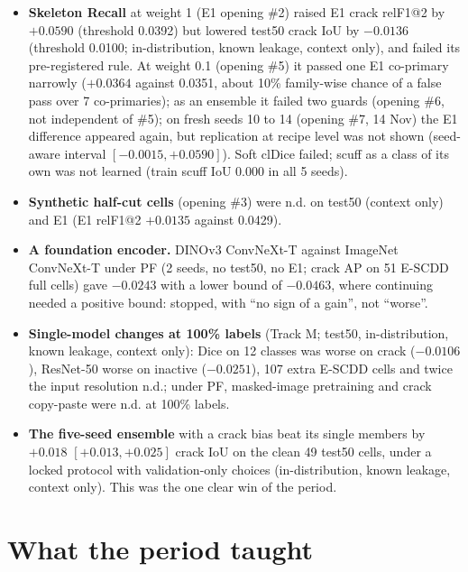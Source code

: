\begin{itemize}
  \item \textbf{Skeleton Recall} \citep{kirchhoff2024skeletonrecall} at weight 1 (E1 opening \#2) raised E1 crack relF1@2 by $+0.0590$
    (threshold 0.0392) but lowered test50 crack IoU by $-0.0136$ (threshold 0.0100; in-distribution, known leakage, context
    only), and failed its pre-registered rule. At weight
    0.1 (opening \#5) it passed one E1 co-primary narrowly ($+0.0364$ against 0.0351, about 10\% family-wise chance of a false pass
    over 7 co-primaries); as an ensemble it failed two guards (opening \#6, not independent of \#5); on fresh seeds 10 to 14 (opening
    \#7, 14 Nov) the E1 difference appeared again, but replication at recipe level was not shown (seed-aware interval
    $[-0.0015, +0.0590]$). Soft clDice failed; scuff as a class of its own was not learned (train scuff IoU 0.000 in all 5 seeds).
  \item \textbf{Synthetic half-cut cells} (opening \#3) were n.d. on test50 (context only) and E1 (E1 relF1@2 $+0.0135$ against 0.0429).
  \item \textbf{A foundation encoder.} DINOv3 ConvNeXt-T \citep{simeoni2025dinov3} against ImageNet ConvNeXt-T under PF (2 seeds,
    no test50, no E1; crack AP on 51 E-SCDD full cells) gave $-0.0243$ with a lower bound of $-0.0463$, where continuing needed a
    positive bound: stopped, with ``no sign of a gain'', not ``worse''.
  \item \textbf{Single-model changes at 100\% labels} (Track M; test50, in-distribution, known leakage, context only): Dice on 12 classes was worse on crack ($-0.0106$), ResNet-50 worse on
    inactive ($-0.0251$), 107 extra E-SCDD cells and twice the input resolution n.d.; under PF, masked-image pretraining and crack
    copy-paste were n.d. at 100\% labels.
  \item \textbf{The five-seed ensemble} with a crack bias beat its single members by $+0.018$ $[+0.013, +0.025]$ crack IoU on the clean
    49 test50 cells, under a locked protocol with validation-only choices (in-distribution, known leakage, context only). This was the
    one clear win of the period.
\end{itemize}

\section{What the period taught}\label{sec:legacy-taught}

